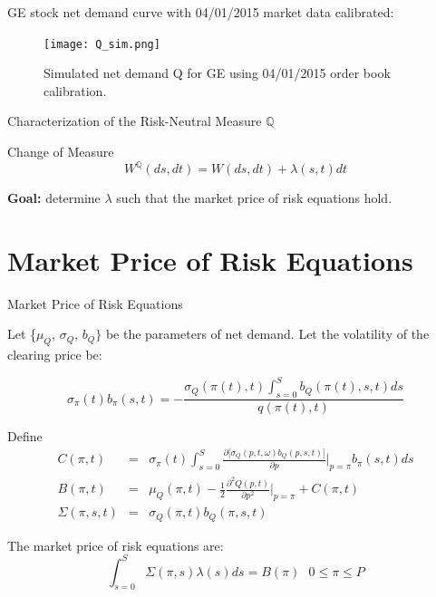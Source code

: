 \documentclass{beamer}
\begin{document}
\begin{frame}[shrink=30]{{\color{cyan}{\large Simulation Result}}}
\bigskip
GE stock net demand curve with 04/01/2015 market data calibrated:

\vspace{10pt}
\begin{figure}[H]
\begin{center}
	\texttt{[image: Q\_sim.png]}
\caption{Simulated net demand Q for GE using 04/01/2015 order book calibration.}
\label{fig:Sim_Q_GE}
\end{center}
\end{figure}

\end{frame}


\begin{frame}[shrink=30]{{\color{cyan}Characterization of the Risk-Neutral Measure $\mathbb{Q}$}}
\bigskip

\bigskip
\begin{block}{Change of Measure}
\begin{equation*}
W^{\mathbb{Q}}(ds,dt)=W(ds,dt)+\lambda (s,t)dt
\end{equation*}

\textbf{Goal:} determine $\lambda $ such that the market price of risk equations hold.
\end{block}

\end{frame}

\section{Market Price of Risk Equations}
\begin{frame}[shrink=30]{{\color{cyan}Market Price of Risk Equations}}

Let \{$%
\mu _{Q}$, $\sigma _{Q}$, $b_{Q}\}$ be the parameters of net demand.
Let the volatility of the clearing price be:

\begin{equation*}
\sigma _{\pi }(t)b_{\pi }(s,t)=-\frac{\sigma _{Q}(\pi
(t),t)\int_{s=0}^{S}b_{Q}(\pi (t),s,t)ds}{q(\pi (t),t)}
\end{equation*}

\bigskip
Define
\begin{eqnarray*}
C(\pi ,t) &=&\sigma _{\pi }(t)\int_{s=0}^{S}\frac{\partial \lbrack \sigma
_{Q}(p,t,\omega )b_{Q}(p,s,t)]}{\partial p}|_{p=\pi }b_{\pi }(s,t)ds \\
B(\pi ,t) &=&\mu _{Q}(\pi ,t)-\frac{1}{2}\frac{\partial ^{2}Q(p,t)}{\partial
p^{2}}|_{p=\pi }+C(\pi ,t) \\
\Sigma (\pi ,s,t) &=&\sigma _{Q}(\pi ,t)b_{Q}(\pi ,s,t)
\end{eqnarray*}

\bigskip
The market price of risk equations are:
\begin{equation*}
\int_{s=0}^{S}\Sigma (\pi ,s)\lambda (s)ds=B(\pi ) \text{ \ \ \ \ \ } 0\leq \pi \leq P
\end{equation*}

\end{frame}
\end{document}
